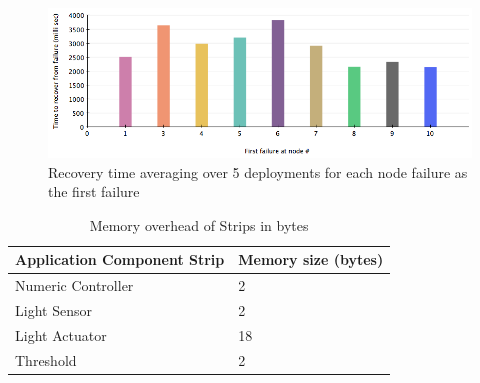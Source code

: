 \begin{figure}[h!]
\centering
    \includegraphics[width=\linewidth]{figures/results-average-recovery-time-plus-message-overhead}
\caption{Recovery time averaging over 5 deployments for each node failure as the first failure}
\label{fig:results}
\end{figure}

\begin{table}
\centering
\caption{Memory overhead of Strips in bytes}
\label{tbl:results-memory-overhead-strip}
  \begin{tabular}{|l|l|}
  \hline
  \textbf{Application Component Strip} & \textbf{Memory size (bytes)} \\
  \hline
  Numeric Controller & 2 \\
  \hline
  Light Sensor & 2 \\
  \hline
  Light Actuator & 18 \\
  \hline
  Threshold & 2 \\
  \hline
  \end{tabular}
\end{table}

